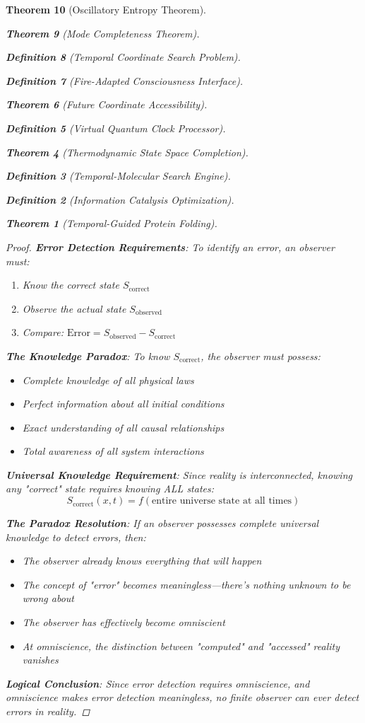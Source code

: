 \documentclass[12pt,a4paper]{article}
\newtheorem{theorem}{Theorem}[section]
\newtheorem{definition}[theorem]{Definition}
\begin{document}
\begin{theorem}[Oscillatory Entropy Theorem]
\begin{theorem}[Mode Completeness Theorem]
\begin{enumerate}
\begin{definition}[Temporal Coordinate Search Problem]
\begin{algorithm}
\begin{definition}[Fire-Adapted Consciousness Interface]
\begin{theorem}[Future Coordinate Accessibility]
\begin{definition}[Virtual Quantum Clock Processor]
\begin{itemize}
\begin{itemize}
\begin{theorem}[Thermodynamic State Space Completion]
\begin{definition}[Temporal-Molecular Search Engine]
\begin{definition}[Information Catalysis Optimization]
\begin{algorithm}
\begin{theorem}[Temporal-Guided Protein Folding]
\begin{table}[h]
\begin{proof}
\textbf{Error Detection Requirements}: To identify an error, an observer must:
\begin{enumerate}
    \item Know the correct state $S_{\text{correct}}$
    \item Observe the actual state $S_{\text{observed}}$
    \item Compare: $\text{Error} = S_{\text{observed}} - S_{\text{correct}}$
\end{enumerate}

\textbf{The Knowledge Paradox}: To know $S_{\text{correct}}$, the observer must possess:
\begin{itemize}
    \item Complete knowledge of all physical laws
    \item Perfect information about all initial conditions
    \item Exact understanding of all causal relationships
    \item Total awareness of all system interactions
\end{itemize}

\textbf{Universal Knowledge Requirement}: Since reality is interconnected, knowing any "correct" state requires knowing ALL states:
$$S_{\text{correct}}(x,t) = f(\text{entire universe state at all times})$$

\textbf{The Paradox Resolution}: If an observer possesses complete universal knowledge to detect errors, then:
\begin{itemize}
    \item The observer already knows everything that will happen
    \item The concept of "error" becomes meaningless—there's nothing unknown to be wrong about
    \item The observer has effectively become omniscient
    \item At omniscience, the distinction between "computed" and "accessed" reality vanishes
\end{itemize}

\textbf{Logical Conclusion}: Since error detection requires omniscience, and omniscience makes error detection meaningless, no finite observer can ever detect errors in reality.
\end{proof}


\end{table}
\end{theorem}
\end{algorithm}
\end{definition}
\end{definition}
\end{theorem}
\end{itemize}
\end{itemize}
\end{definition}
\end{theorem}
\end{definition}
\end{algorithm}
\end{definition}
\end{enumerate}
\end{theorem}
\end{theorem}
\end{document}
